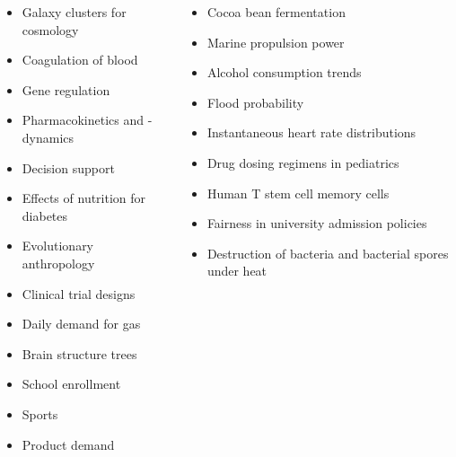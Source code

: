 \documentclass[10pt,handout]{beamer}
\begin{document}
\begin{frame}

  \begin{columns}[T] %
 \begin{column}{.49\textwidth}
{  \footnotesize
  \begin{itemize}
 \item Galaxy clusters for cosmology
 \item Coagulation of blood
 \item Gene regulation
 \item Pharmacokinetics and -dynamics
 \item Decision support
 \item Effects of nutrition for diabetes
 \item Evolutionary anthropology
 \item Clinical trial designs
 \item Daily demand for gas
 \item Brain structure trees
 \item School enrollment
 \item Sports
 \item Product demand
 \end{itemize}
 }
\end{column}
 \begin{column}{.49\textwidth}
{    \footnotesize
  \begin{itemize}
 \item Cocoa bean fermentation
 \item Marine propulsion power
 \item Alcohol consumption trends
 \item Flood probability
 \item Instantaneous heart rate distributions
 \item Drug dosing regimens in pediatrics
 \item Human T stem cell memory cells
 \item Fairness in university admission policies
 \item Destruction of bacteria and bacterial spores under heat
 \end{itemize}
 }
\end{column}
\end{columns}
\end{frame}
\end{document}
